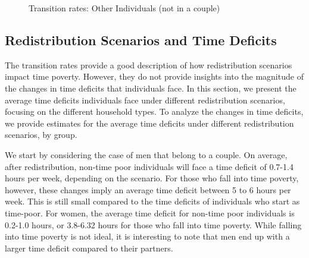 \documentclass[
  11pt,
]{article}
\begin{document}
\begin{figure}[H]


\caption{\label{fig-transition3}Transition rates: Other Individuals (not
in a couple)}

\end{figure}%

\subsection{Redistribution Scenarios and Time
Deficits}\label{redistribution-scenarios-and-time-deficits}

The transition rates provide a good description of how redistribution
scenarios impact time poverty. However, they do not provide insights
into the magnitude of the changes in time deficits that individuals
face. In this section, we present the average time deficits individuals
face under different redistribution scenarios, focusing on the different
household types. To analyze the changes in time deficits, we provide
estimates for the average time deficits under different redistribution
scenarios, by group.

We start by considering the case of men that belong to a couple. On
average, after redistribution, non-time poor individuals will face a
time deficit of 0.7-1.4 hours per week, depending on the scenario. For
those who fall into time poverty, however, these changes imply an
average time deficit between 5 to 6 hours per week. This is still small
compared to the time deficits of individuals who start as time-poor. For
women, the average time deficit for non-time poor individuals is 0.2-1.0
hours, or 3.8-6.32 hours for those who fall into time poverty. While
falling into time poverty is not ideal, it is interesting to note that
men end up with a larger time deficit compared to their partners.
\end{document}

